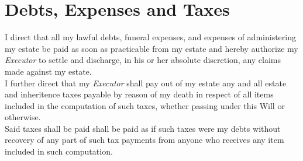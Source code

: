 
\section{Debts, Expenses and Taxes}
\label{sec:debts}

I direct that all my lawful debts, funeral expenses, and expenses of administering my estate be paid as soon as practicable from my estate and hereby authorize my \textit{Executor} to settle and discharge, in his or her absolute discretion, any claims made against my estate. \\

\noindent I further direct that my \textit{Executor} shall pay out of my estate any and all estate and inheritence taxes payable by reason of my death in respect of all items included in the computation of such taxes, whether passing under this Will or otherwise. \\ 

\noindent Said taxes shall be paid shall be paid as if such taxes were my debts without recovery of any part of such tax payments from anyone who receives any item included in such computation. 


